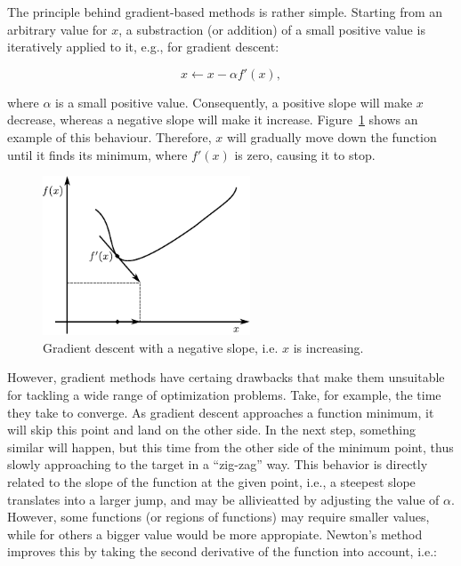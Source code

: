 The principle behind gradient-based methods is rather simple. Starting
from an arbitrary value for $x$, a substraction (or addition) of
a small positive value is iteratively applied to it, e.g., for gradient
descent:

\begin{equation}
x\leftarrow x-\alpha f'(x),
\end{equation}


\noindent where $\alpha$ is a small positive value. Consequently,
a positive slope will make $x$ decrease, whereas a negative slope
will make it increase. Figure~\ref{fig:02-gradient_descent} shows
an example of this behaviour. Therefore, $x$ will gradually move
down the function until it finds its minimum, where $f'(x)$ is zero,
causing it to stop.

\begin{figure}
\centering

\includegraphics[width=0.55\textwidth]{02-background_and_motivation/img/gradient_descent}

\caption{Gradient descent with a negative slope, i.e. $x$ is increasing. \label{fig:02-gradient_descent}}
\end{figure}


However, gradient methods have certaing drawbacks that make them unsuitable
for tackling a wide range of optimization problems. Take, for example,
the time they take to converge. As gradient descent approaches a function
minimum, it will skip this point and land on the other side. In the
next step, something similar will happen, but this time from the other
side of the minimum point, thus slowly approaching to the target in
a ``zig-zag'' way. This behavior is directly related to the slope
of the function at the given point, i.e., a steepest slope translates
into a larger jump, and may be allivieatted by adjusting the value
of $\alpha$. However, some functions (or regions of functions) may
require smaller values, while for others a bigger value would be more
appropiate. Newton's method improves this by taking the second derivative
of the function into account, i.e.:

